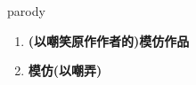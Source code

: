 
\begin{frame}
{\huge parody}
\begin{center}
\begin{enumerate}\Large
  \item \textbf{(以嘲笑原作作者的)模仿作品}
  \item \textbf{模仿(以嘲弄)}
\end{enumerate}
\end{center}
\end{frame}
